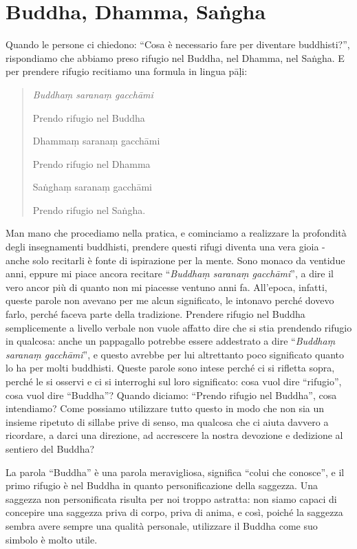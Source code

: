 \chapter{Buddha, Dhamma, Saṅgha}

Quando le persone ci chiedono: ``Cosa è necessario fare per diventare
buddhisti?'', rispondiamo che abbiamo preso rifugio nel Buddha, nel
Dhamma, nel Saṅgha. E per prendere rifugio recitiamo una formula in
lingua pāḷi:

\begin{quote}
\itshape
Buddhaṃ saranaṃ gacchāmi

\vin Prendo rifugio nel Buddha

Dhammaṃ saranaṃ gacchāmi

\vin Prendo rifugio nel Dhamma

Saṅghaṃ saranaṃ gacchāmi

\vin Prendo rifugio nel Saṅgha.
\end{quote}

Man mano che procediamo nella pratica, e cominciamo a realizzare la
profondità degli insegnamenti buddhisti, prendere questi rifugi diventa
una vera gioia - anche solo recitarli è fonte di ispirazione per la
mente. Sono monaco da ventidue anni, eppure mi piace ancora recitare
``\emph{Buddhaṃ saranaṃ gacchāmi}'', a dire il vero ancor più di quanto
non mi piacesse ventuno anni fa. All'epoca, infatti, queste parole non
avevano per me alcun significato, le intonavo perché dovevo farlo,
perché faceva parte della tradizione. Prendere rifugio nel Buddha
semplicemente a livello verbale non vuole affatto dire che si stia
prendendo rifugio in qualcosa: anche un pappagallo potrebbe essere
addestrato a dire ``\emph{Buddhaṃ saranaṃ gacchāmi}'', e questo avrebbe
per lui altrettanto poco significato quanto lo ha per molti buddhisti.
Queste parole sono intese perché ci si rifletta sopra, perché le si
osservi e ci si interroghi sul loro significato: cosa vuol dire
``rifugio'', cosa vuol dire ``Buddha''? Quando diciamo: ``Prendo rifugio
nel Buddha'', cosa intendiamo? Come possiamo utilizzare tutto questo in
modo che non sia un insieme ripetuto di sillabe prive di senso, ma
qualcosa che ci aiuta davvero a ricordare, a darci una direzione, ad
accrescere la nostra devozione e dedizione al sentiero del Buddha?

La parola ``Buddha'' è una parola meravigliosa, significa ``colui che
conosce'', e il primo rifugio è nel Buddha in quanto personificazione
della saggezza. Una saggezza non personificata risulta per noi troppo
astratta: non siamo capaci di concepire una saggezza priva di corpo,
priva di anima, e così, poiché la saggezza sembra avere sempre una
qualità personale, utilizzare il Buddha come suo simbolo è molto utile.

